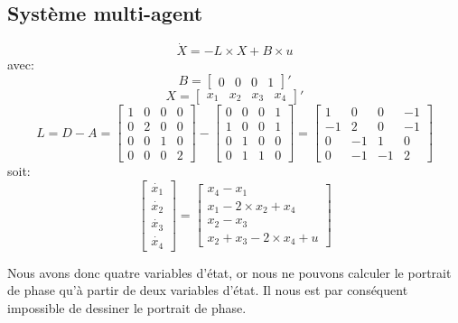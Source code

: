 \documentclass[a4paper,12pt]{article}
\begin{document}
    \subsection{Système multi-agent}
    \label{sub:Système multi-agent}
      \[
        \dot{X} = -L \times X + B \times u
      \]
      avec:
      \[B =
        \left[
              \begin{array}{cccc}
                0 & 0 & 0 & 1
              \end{array}
        \right]'\]
      \[X =
        \left[
              \begin{array}{cccc}
                x_1 & x_2 & x_3 & x_4
              \end{array}
        \right]'\]
      \[L = D - A =
        \left[
              \begin{array}{cccc}
                1 & 0 & 0 & 0\\
                0 & 2 & 0 & 0\\
                0 & 0 & 1 & 0\\
                0 & 0 & 0 & 2
              \end{array}
        \right] -
        \left[
              \begin{array}{cccc}
                0 & 0 & 0 & 1\\
                1 & 0 & 0 & 1\\
                0 & 1 & 0 & 0\\
                0 & 1 & 1 & 0
              \end{array}
        \right] =
        \left[
              \begin{array}{cccc}
                1 &  0 & 0 & -1\\
               -1 &  2 & 0 & -1\\
                0 & -1 & 1 &  0\\
                0 & -1 &-1 &  2
              \end{array}
        \right]\]
      soit:
      \[
        \left[
              \begin{array}{c}
                \dot{x_1}\\
                \dot{x_2}\\
                \dot{x_3}\\
                \dot{x_4}
              \end{array}
        \right] =
        \left[
              \begin{array}{c}
                x_4 - x_1\\
                x_1 - 2 \times x_2 + x_4\\
                x_2 - x_3\\
                x_2 + x_3 - 2 \times x_4 + u
              \end{array}
        \right]\]
        \par Nous avons donc quatre variables d'état, or nous ne pouvons calculer le portrait de phase qu'à partir de deux variables d'état.
        Il nous est par conséquent impossible de dessiner le portrait de phase.
      \newpage
\end{document}
